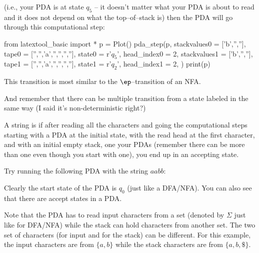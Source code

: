 (i.e., your PDA is at state $q_5$  --
it doesn't matter what your PDA is about to read and it
does not depend on what the top--of--stack is)
then the PDA will go through this computational step:

\begin{python}
from latextool_basic import *
p = Plot()
pda_step(p,
         stackvalues0 = ['b','',''],
         tape0 = ['','','a','','','',''],
         state0 = r'$q_5$',
         head_index0 = 2,
         stackvalues1 = ['b','',''],
         tape1 = ['','','a','','','',''],
         state1 = r'$q_2$',
         head_index1 = 2,
        )        
print(p)
\end{python}

This transition is most similar to the $\ep$--transition of an NFA.

And remember that there can be multiple transition from a 
state labeled in the same way (I said it's non-deterministic right?)

A string is  if after reading all the characters
and going the computational steps starting with a PDA
at the initial state, with the read head at the first character, and with
an initial empty stack,
one your PDAs (remember there can be more than one even though you start
with one),
you end up in an accepting state.

\newpage
Try running the following PDA with the string $aabb$:

\begin{center}
\end{center}

Clearly the start state of the PDA is $q_0$ (just like a DFA/NFA).
You can also see that there are accept states in a PDA.

Note that the PDA has to read input characters from a set (denoted
by $\Sigma$ just like for DFA/NFA)
while the stack can hold characters from another set.
The two set of characters (for input and for the stack)
can be different.
For this example, the input characters are from $\{a, b\}$
while the stack characters are from $\{a, b, \$\}$.

